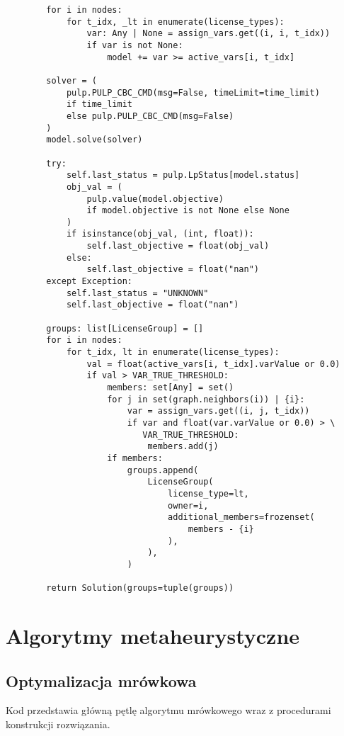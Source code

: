 \begin{verbatim}
        for i in nodes:
            for t_idx, _lt in enumerate(license_types):
                var: Any | None = assign_vars.get((i, i, t_idx))
                if var is not None:
                    model += var >= active_vars[i, t_idx]

        solver = (
            pulp.PULP_CBC_CMD(msg=False, timeLimit=time_limit)
            if time_limit
            else pulp.PULP_CBC_CMD(msg=False)
        )
        model.solve(solver)

        try:
            self.last_status = pulp.LpStatus[model.status]
            obj_val = (
                pulp.value(model.objective)
                if model.objective is not None else None
            )
            if isinstance(obj_val, (int, float)):
                self.last_objective = float(obj_val)
            else:
                self.last_objective = float("nan")
        except Exception:
            self.last_status = "UNKNOWN"
            self.last_objective = float("nan")

        groups: list[LicenseGroup] = []
        for i in nodes:
            for t_idx, lt in enumerate(license_types):
                val = float(active_vars[i, t_idx].varValue or 0.0)
                if val > VAR_TRUE_THRESHOLD:
                    members: set[Any] = set()
                    for j in set(graph.neighbors(i)) | {i}:
                        var = assign_vars.get((i, j, t_idx))
                        if var and float(var.varValue or 0.0) > \
                           VAR_TRUE_THRESHOLD:
                            members.add(j)
                    if members:
                        groups.append(
                            LicenseGroup(
                                license_type=lt,
                                owner=i,
                                additional_members=frozenset(
                                    members - {i}
                                ),
                            ),
                        )

        return Solution(groups=tuple(groups))
\end{verbatim}

\section{Algorytmy metaheurystyczne}
\subsection{Optymalizacja mrówkowa}
Kod przedstawia główną pętlę algorytmu mrówkowego wraz z
procedurami konstrukcji rozwiązania.

